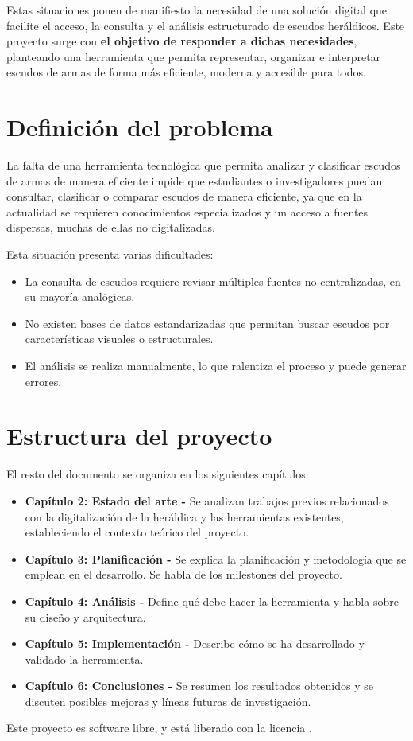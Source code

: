 Estas situaciones ponen de manifiesto la necesidad de una solución digital que
facilite el acceso, la consulta y el análisis estructurado de escudos heráldicos. 
Este proyecto surge con \textbf{el objetivo de responder a dichas necesidades}, planteando 
una herramienta que permita representar, organizar e interpretar escudos de armas 
de forma más eficiente, moderna y accesible para todos.

\section{Definición del problema}

La falta de una herramienta tecnológica que permita analizar y clasificar escudos de 
armas de manera eficiente impide que estudiantes o investigadores puedan consultar, 
clasificar o comparar escudos de manera eficiente, ya que en la actualidad se requieren
conocimientos especializados y un acceso a fuentes dispersas, muchas de ellas no 
digitalizadas.

Esta situación presenta varias dificultades:

\begin{itemize}
    \item La consulta de escudos requiere revisar múltiples fuentes no centralizadas, 
    en su mayoría analógicas.
    \item No existen bases de datos estandarizadas que permitan buscar escudos por
    características visuales o estructurales.
    \item El análisis se realiza manualmente, lo que ralentiza el proceso y puede
    generar errores.
\end{itemize}

\section{Estructura del proyecto}
El resto del documento se organiza en los siguientes capítulos:

\begin{itemize}
    \item \textbf{Capítulo 2: Estado del arte - }Se analizan trabajos previos relacionados
    con la digitalización de la heráldica y las herramientas existentes, estableciendo
    el contexto teórico del proyecto.
    \item \textbf{Capítulo 3: Planificación - }Se explica la planificación y metodología
    que se emplean en el desarrollo. Se habla de los milestones del proyecto.
    \item \textbf{Capítulo 4: Análisis - }Define qué debe hacer la herramienta y habla
    sobre su diseño y arquitectura.
    \item \textbf{Capítulo 5: Implementación - }Describe cómo se ha desarrollado y validado
    la herramienta. 
    \item \textbf{Capítulo 6: Conclusiones - }Se resumen los resultados obtenidos y se
    discuten posibles mejoras y líneas futuras de investigación.
\end{itemize}

Este proyecto es software libre, y está liberado con la licencia \cite{gplv3}.